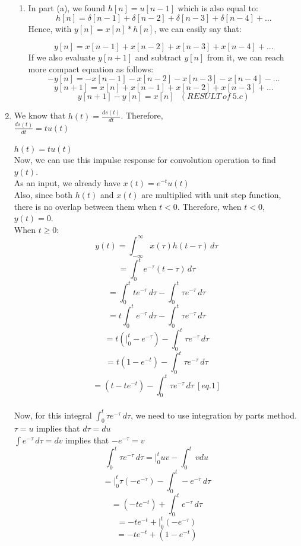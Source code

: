 \documentclass[10pt,a4paper, margin=1in]{article}
\begin{document}
\begin{enumerate}
\begin{enumerate}
     
    \item %
    In part (a), we found $h[n] = u[n-1]$ which is also equal to: 
    \[ h[n] = \delta[n-1] + \delta[n-2]+ \delta[n-3]+ \delta[n-4]+ ... \]
    Hence, with $y[n] = x[n] * h[n]$, we can easily say that:
    
    \[ y[n] = x[n-1] + x[n-2]+ x[n-3]+ x[n-4]+... \]
    If we also evaluate $y[n+1]$ and subtract $y[n]$ from it,  we can reach more compact equation as follows: \\
    \[ -y[n] = -x[n-1] - x[n-2] - x[n-3] - x[n-4] - ... \]
    \[ y[n+1] = x[n] + x[n-1]+ x[n-2]+ x[n-3]+... \]
    \[ y[n+1] - y[n] = x[n] \ \ \ (RESULT \ of \ 5.c) \]     
    \end{enumerate}

\item %

We know that $h(t) = \frac{ds(t)}{dt}$. Therefore, \\

$\frac{ds(t)}{dt} = tu(t)$ \\
\\
$h(t) = tu(t)$ \\
Now, we can use this impulse response for convolution operation to find $y(t)$. \\
As an input, we already have $x(t) = e^{-t}u(t)$ \\
Also, since both $h(t)$ and $x(t)$ are multiplied with unit step function, there is no overlap between them when $t<0$. Therefore, when $t<0$, $y(t) = 0$.\\
When $t \geq 0$:
 \[y(t) =  \int_{- \infty}^{\infty} x(\tau)h(t-\tau) \,d\tau   \]
 \[ =  \int_{0}^{t} e^{-\tau}(t-\tau) \,d\tau   \]
 \[ =  \int_{0}^{t} te^{-\tau} \,d\tau - \int_{0}^{t} \tau e^{-\tau} \,d\tau  \]
 \[ =  t \int_{0}^{t} e^{-\tau} \,d\tau - \int_{0}^{t} \tau e^{-\tau} \,d\tau  \]
  \[ =  t  (|_0^t -e^{-\tau}) - \int_{0}^{t} \tau e^{-\tau} \,d\tau  \]
\[ =  t  (1 -e^{-t}) - \int_{0}^{t} \tau e^{-\tau} \,d\tau  \]
\[ =    (t -te^{-t}) - \int_{0}^{t} \tau e^{-\tau} \,d\tau  \ [eq.1] \]  \\
Now, for this integral $\int_{0}^{t} \tau e^{-\tau} \,d\tau$, we need to use integration by parts method. \\

$\tau = u$ implies that $d\tau = du$ \\
$\int  e^{-\tau} \,d\tau = dv$ implies that $-e^{-\tau} = v$ 
\[ \int_{0}^{t} \tau e^{-\tau} \,d\tau = |_0^t uv - \int_0^t \, vdu \]
\[  = |_0^t \tau (-e^{-\tau}) - \int_0^t -e^{-\tau} \,d\tau \]
\[  = (-te^{-t}) + \int_0^t e^{-\tau} \,d\tau \]
\[  = -te^{-t} + |_0^t (-e^{-\tau}) \]
\[  = -te^{-t} + (1-e^{-t}) \] \\


\end{enumerate}
\end{document}
